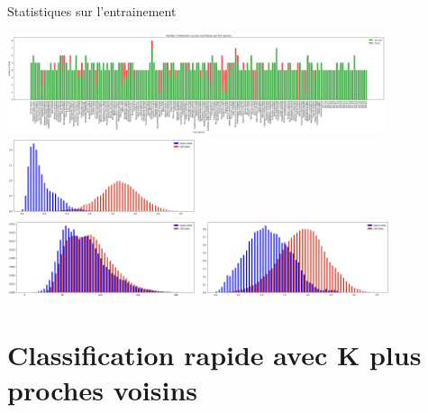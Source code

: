 \documentclass[10pt,xcolor={x11names}]{beamer}
\begin{document}
\begin{frame}{Statistiques sur l'entrainement}
	\begin{center}
		\includegraphics[width=30em,natwidth=1998,natheight=533]{stats1/tl1.2_150.png} \\
		\includegraphics[width=15em,natwidth=856,natheight=352]{stats1/tl1.2_150_repartition.png} \\
		\includegraphics[width=15em,natwidth=856,natheight=352]{stats1/same_repartition.png}
		\includegraphics[width=15em,natwidth=856,natheight=352]{stats1/tl1_23in_repartition.png}
	\end{center}
\end{frame}

\section{Classification rapide avec K plus proches voisins}
\end{document}
